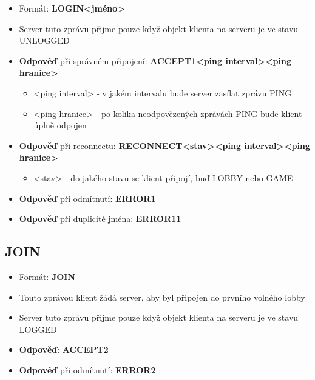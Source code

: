 \documentclass[12pt]{report}
\begin{document}
		\begin{itemize}
			\item Formát: \textbf{LOGIN{\textbar}{\textless}jméno{\textgreater}}
			\item Server tuto zprávu přijme pouze když objekt klienta na serveru je ve stavu UNLOGGED
			\item \textbf{Odpověď} při správném připojení: \textbf{ACCEPT{\textbar}1{\textbar}{\textless}ping interval{\textgreater}{\textbar}{\textless}ping hranice{\textgreater}}
			
			\begin{itemize}
				\item {\textless}ping interval{\textgreater} - v jakém intervalu bude server zasílat zprávu PING
				\item {\textless}ping hranice{\textgreater} - po kolika neodpovězených zprávách PING bude klient úplně odpojen
			\end{itemize} 
			\item \textbf{Odpověď} při reconnectu: \textbf{RECONNECT{\textbar}{\textless}stav{\textgreater}{\textbar}{\textless}ping interval{\textgreater}{\textbar}{\textless}ping hranice{\textgreater}}
			\begin{itemize}
				\item {\textless}stav{\textgreater} - do jakého stavu se klient připojí, buď LOBBY nebo GAME
			\end{itemize} 
			\item \textbf{Odpověď} při odmítnutí: \textbf{ERROR{\textbar}1}
			\item \textbf{Odpověď} při duplicitě jména: \textbf{ERROR{\textbar}1{\textbar}1}
		\end{itemize}
	
	\subsection{JOIN}
		\begin{itemize}
			\item Formát: \textbf{JOIN}
			\item Touto zprávou klient žádá server, aby byl připojen do prvního volného lobby
			\item Server tuto zprávu přijme pouze když objekt klienta na serveru je ve stavu LOGGED
			\item \textbf{Odpověď}:  \textbf{ACCEPT{\textbar}2}
			\item \textbf{Odpověď} při odmítnutí: \textbf{ERROR{\textbar}2}
		\end{itemize}
	
\end{document}
